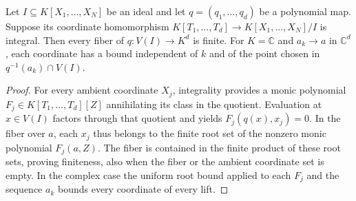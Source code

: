 \begin{lemma}
\label{lem:complex-closure-finite-fibers}
\leanok
Let $I\subseteq K[X_1,\ldots,X_N]$ be an ideal and let
$q=(q_1,\ldots,q_d)$ be a polynomial map. Suppose its coordinate
homomorphism
$K[T_1,\ldots,T_d]\to K[X_1,\ldots,X_N]/I$
is integral. Then every fiber of $q:V(I)\to K^d$ is finite.
For $K=\mathbb C$ and $a_k\to a$ in $\mathbb C^d$, each coordinate has
a bound independent of $k$ and of the point chosen in
$q^{-1}(a_k)\cap V(I)$.
\end{lemma}
\begin{proof}
For every ambient coordinate $X_j$, integrality provides a monic polynomial
$F_j\in K[T_1,\ldots,T_d][Z]$ annihilating its class in the quotient.
Evaluation at $x\in V(I)$ factors through that quotient and yields
$F_j(q(x),x_j)=0$. In the fiber over $a$, each $x_j$ thus belongs to
the finite root set of the nonzero monic polynomial $F_j(a,Z)$.
The fiber is contained in the finite product of these root sets, proving
finiteness, also when the fiber or the ambient coordinate set is empty.
In the complex case the uniform root bound applied to each $F_j$ and
the sequence $a_k$ bounds every coordinate of every lift.
\end{proof}

